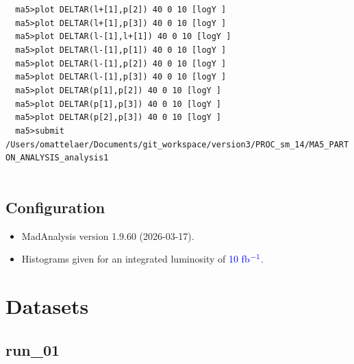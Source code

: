 \documentclass[a4paper, 10pt]{article}
\begin{document}
\texttt{ }\texttt{ }\texttt{ma5>plot DELTAR(l+[1],p[2]) 40 0 10 [logY ]\\
}
\texttt{ }\texttt{ }\texttt{ma5>plot DELTAR(l+[1],p[3]) 40 0 10 [logY ]\\
}
\texttt{ }\texttt{ }\texttt{ma5>plot DELTAR(l-[1],l+[1]) 40 0 10 [logY ]\\
}
\texttt{ }\texttt{ }\texttt{ma5>plot DELTAR(l-[1],p[1]) 40 0 10 [logY ]\\
}
\texttt{ }\texttt{ }\texttt{ma5>plot DELTAR(l-[1],p[2]) 40 0 10 [logY ]\\
}
\texttt{ }\texttt{ }\texttt{ma5>plot DELTAR(l-[1],p[3]) 40 0 10 [logY ]\\
}
\texttt{ }\texttt{ }\texttt{ma5>plot DELTAR(p[1],p[2]) 40 0 10 [logY ]\\
}
\texttt{ }\texttt{ }\texttt{ma5>plot DELTAR(p[1],p[3]) 40 0 10 [logY ]\\
}
\texttt{ }\texttt{ }\texttt{ma5>plot DELTAR(p[2],p[3]) 40 0 10 [logY ]\\
}
\texttt{ }\texttt{ }\texttt{ma5>submit /\-Users/\-omattelaer/\-Documents/\-git\_workspace/\-version3/\-PROC\_sm\_14/\-MA5\_PARTON\_ANALYSIS\_analysis1\\
}
\texttt{ }\texttt{ }\subsection{ Configuration}

\begin{itemize}
  \item MadAnalysis version 1.9.60 (2026-03-17).
   \item Histograms given for an integrated luminosity of \textcolor{blue}{10}\textcolor{blue}{ fb}$^{\textcolor{blue}{-1}}$\textcolor{blue}{.}
\textcolor{blue}{}
\end{itemize}
\newpage
\section{ Datasets}

\subsection{ run\_01}
\end{document}

